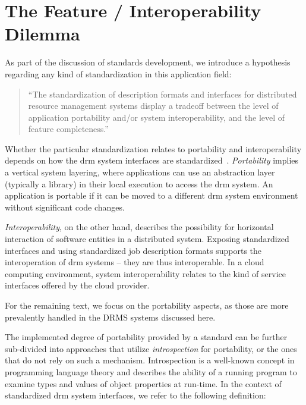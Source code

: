 \documentclass[twocolumn]{svjour3}       %
\begin{document}
\section{The Feature / Interoperability Dilemma}
\label{sec:hypothesis}

As part of the discussion of standards development, we introduce a hypothesis regarding any kind of standardization in this application field:

\begin{quote}
``The standardization of description formats and interfaces for distributed resource management systems display a tradeoff between the level of application portability and/or system interoperability, and the level of feature completeness.''
\end{quote}

Whether the particular standardization relates to portability and interoperability depends on how the \gls{drm} system interfaces are standardized~\cite{citemaster_9638}. \emph{Portability} implies a vertical system layering, where applications can use an abstraction layer (typically a library) in their local execution to access the \gls{drm} system. An application is portable if it can be moved to a different \gls{drm} system environment without significant code changes. 

\emph{Interoperability}, on the other hand, describes the possibility for horizontal interaction of software entities in a distributed system.  Exposing standardized interfaces and using standardized job description formats supports the interoperation of \gls{drm} systems -- they are thus interoperable.  In a cloud computing environment, system interoperability relates to the kind of service interfaces offered by the cloud provider.


For the remaining text, we focus on the portability aspects, as those are more prevalently handled in the DRMS systems discussed here.

The implemented degree of portability provided by a standard can be further sub-divided into approaches that utilize \emph{introspection} for portability, or the ones that do not rely on such a mechanism. Introspection is a well-known concept in programming language theory and describes the ability of a running program to examine types and values of object properties at run-time. In the context of standardized \gls{drm} system interfaces, we refer to the following definition:
\end{document}
